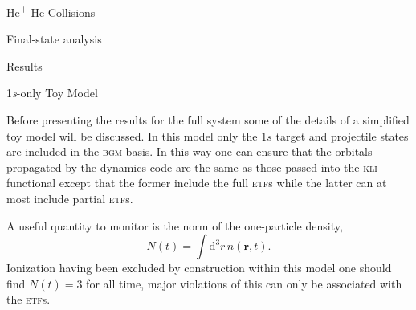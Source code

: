 \documentclass[letterpaper, 11 pt]{report}
\begin{document}
\begin{chapter}{\texorpdfstring{He\textsuperscript{+}}{He+}-He Collisions \label{chap:hephe}}
\begin{section}{Final-state analysis \label{sec:hephe-det}}
   \end{section}

   \begin{section}{Results \label{sec:hephe-disc}}

      \begin{subsection}{1\textit{s}-only Toy Model \label{sec:toy}}

         Before presenting the results for the full system some of the details of a simplified toy model
         will be discussed. In this model only the $1s$ target and projectile states are included in
         the \textsc{bgm} basis. In this way one can ensure that the orbitals propagated by the dynamics
         code are the same as those passed into the \textsc{kli} functional except that the former
         include the full \textsc{etf}s while the latter can at most include partial \textsc{etf}s.

         A useful quantity to monitor is the norm of the one-particle density,
         \begin{equation}
            N(t) = \int \mathrm{d}^3 r \, n(\mathbf{r},t).
         \end{equation}
         Ionization having been excluded by construction within this model one should find $N(t) = 3$
         for all time, major violations of this can only be associated with the \textsc{etf}s.


\end{subsection}
\end{section}
\end{chapter}
\end{document}
